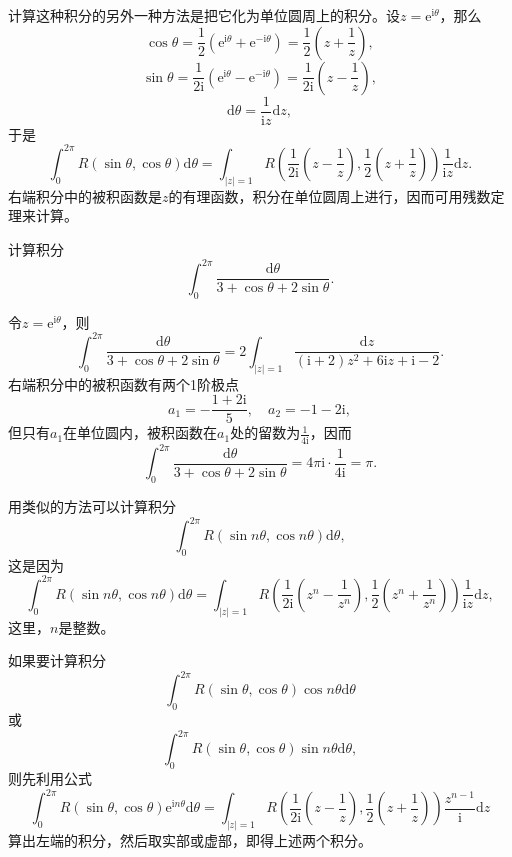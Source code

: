 \documentclass[../../main.tex]{subfiles}%
\begin{document}
计算这种积分的另外一种方法是把它化为单位圆周上的积分。设\( z = \mathrm{e}^{\mathrm{i}\theta} \)，那么
\[
\cos\theta = \frac{1}{2} (\mathrm{e}^{\mathrm{i}\theta} + \mathrm{e}^{-\mathrm{i}\theta}) = \frac{1}{2} \left( z + \frac{1}{z} \right),
\]
\[
\sin\theta = \frac{1}{2\mathrm{i}} (\mathrm{e}^{\mathrm{i}\theta} - \mathrm{e}^{-\mathrm{i}\theta}) = \frac{1}{2\mathrm{i}} \left( z - \frac{1}{z} \right),
\]
\[
\mathrm{d}\theta = \frac{1}{\mathrm{i}z} \mathrm{d}z,
\]
于是
\[
\int_{0}^{2\pi} R(\sin\theta, \cos\theta) \mathrm{d}\theta = \int_{|z| = 1} R\left( \frac{1}{2\mathrm{i}} \left( z - \frac{1}{z} \right), \frac{1}{2} \left( z + \frac{1}{z} \right) \right) \frac{1}{\mathrm{i}z} \mathrm{d}z.
\]
右端积分中的被积函数是\( z \)的有理函数，积分在单位圆周上进行，因而可用残数定理来计算。

\begin{example}
计算积分
\[
\int_{0}^{2\pi} \frac{\mathrm{d}\theta}{3 + \cos\theta + 2\sin\theta}.
\]
\end{example}
\begin{solution}

令\( z = \mathrm{e}^{\mathrm{i}\theta} \)，则
\[
\int_{0}^{2\pi} \frac{\mathrm{d}\theta}{3 + \cos\theta + 2\sin\theta} = 2 \int_{|z| = 1} \frac{\mathrm{d}z}{(\mathrm{i} + 2)z^2 + 6\mathrm{i}z + \mathrm{i} - 2}.
\]
右端积分中的被积函数有两个1阶极点
\[
a_1 = -\frac{1 + 2\mathrm{i}}{5}, \quad a_2 = -1 - 2\mathrm{i},
\]
但只有\( a_1 \)在单位圆内，被积函数在\( a_1 \)处的留数为\( \frac{1}{4\mathrm{i}} \)，因而
\[
\int_{0}^{2\pi} \frac{\mathrm{d}\theta}{3 + \cos\theta + 2\sin\theta} = 4\pi \mathrm{i} \cdot \frac{1}{4\mathrm{i}}
= \pi.
\]

\end{solution}

用类似的方法可以计算积分
\[
\int_{0}^{2\pi} R(\sin n\theta, \cos n\theta) \mathrm{d}\theta,
\]
这是因为
\[
\int_{0}^{2\pi} R(\sin n\theta, \cos n\theta) \mathrm{d}\theta = \int_{|z| = 1} R\left( \frac{1}{2\mathrm{i}} \left( z^n - \frac{1}{z^n} \right), \frac{1}{2} \left( z^n + \frac{1}{z^n} \right) \right) \frac{1}{\mathrm{i}z} \mathrm{d}z,
\]
这里，\( n \)是整数。

如果要计算积分
\[
\int_{0}^{2\pi} R(\sin\theta, \cos\theta) \cos n\theta \mathrm{d}\theta
\]
或
\[
\int_{0}^{2\pi} R(\sin\theta, \cos\theta) \sin n\theta \mathrm{d}\theta,
\]
则先利用公式
\[
\int_{0}^{2\pi} R(\sin\theta, \cos\theta) \mathrm{e}^{\mathrm{i}n\theta} \mathrm{d}\theta = \int_{|z| = 1} R\left( \frac{1}{2\mathrm{i}} \left( z - \frac{1}{z} \right), \frac{1}{2} \left( z + \frac{1}{z} \right) \right) \frac{z^{n - 1}}{\mathrm{i}} \mathrm{d}z \label{formula10}
\]
算出左端的积分，然后取实部或虚部，即得上述两个积分。
\end{document}

